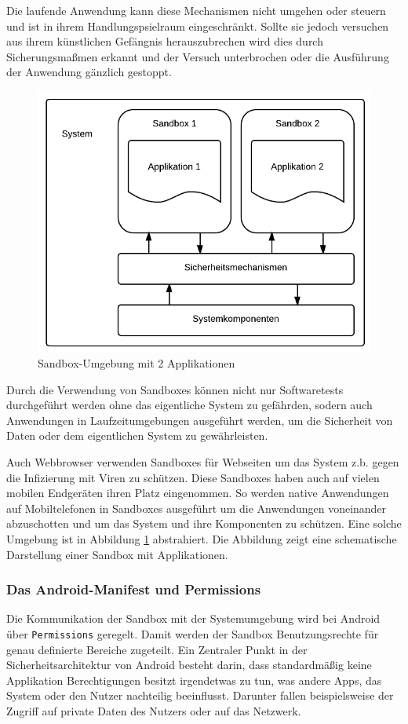 Die laufende Anwendung kann diese Mechanismen nicht umgehen oder steuern und ist in ihrem Handlungspsielraum eingeschränkt. Sollte sie jedoch versuchen aus ihrem künstlichen Gefängnis herauszubrechen wird dies durch Sicherungsmaßmen erkannt und der Versuch unterbrochen oder die Ausführung der Anwendung gänzlich gestoppt.

\begin{figure}[ht!]
\begin{center}
\includegraphics[scale=0.4]{images/sandbox}
\caption{Sandbox-Umgebung mit 2 Applikationen}
\label{sandbox_pic}
\end{center}
\end{figure}

Durch die Verwendung von Sandboxes können nicht nur Softwaretests durchgeführt werden ohne das eigentliche System zu gefährden, sodern auch Anwendungen in Laufzeitumgebungen ausgeführt werden, um die Sicherheit von Daten oder dem eigentlichen System zu gewährleisten. 

Auch Webbrowser verwenden Sandboxes für Webseiten um das System z.b. gegen die Infizierung mit Viren zu schützen. Diese Sandboxes haben auch auf vielen mobilen Endgeräten ihren Platz eingenommen. So werden native Anwendungen auf Mobiltelefonen in Sandboxes ausgeführt um die Anwendungen voneinander abzuschotten und um das System und ihre Komponenten zu schützen. Eine solche Umgebung ist in Abbildung \ref{sandbox_pic} abstrahiert. Die Abbildung zeigt eine schematische Darstellung einer Sandbox mit Applikationen.

\subsubsection{Das Android-Manifest und Permissions}
Die Kommunikation der Sandbox mit der Systemumgebung wird bei Android über \verb+Permissions+ geregelt. Damit werden der Sandbox Benutzungsrechte für genau definierte Bereiche zugeteilt. 
Ein Zentraler Punkt in der Sicherheitsarchitektur von Android besteht darin, dass standardmäßig keine Applikation Berechtigungen besitzt irgendetwas zu tun, was andere Apps, das System oder den Nutzer nachteilig beeinflusst. Darunter fallen beispielsweise der Zugriff auf private Daten des Nutzers oder auf das Netzwerk.

